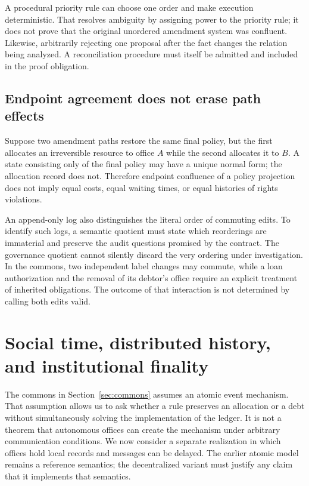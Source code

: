 \documentclass[11pt,letterpaper]{article}
\theoremstyle{plain}
\theoremstyle{definition}
\theoremstyle{remark}
\begin{document}
A procedural priority rule can choose one order and make execution deterministic. That resolves ambiguity by assigning power to the priority rule; it does not prove that the original unordered amendment system was confluent. Likewise, arbitrarily rejecting one proposal after the fact changes the relation being analyzed. A reconciliation procedure must itself be admitted and included in the proof obligation.

\subsection{Endpoint agreement does not erase path effects}
Suppose two amendment paths restore the same final policy, but the first allocates an irreversible resource to office $A$ while the second allocates it to $B$. A state consisting only of the final policy may have a unique normal form; the allocation record does not. Therefore endpoint confluence of a policy projection does not imply equal costs, equal waiting times, or equal histories of rights violations.

An append-only log also distinguishes the literal order of commuting edits. To identify such logs, a semantic quotient must state which reorderings are immaterial and preserve the audit questions promised by the contract. The governance quotient cannot silently discard the very ordering under investigation. In the commons, two independent label changes may commute, while a loan authorization and the removal of its debtor's office require an explicit treatment of inherited obligations. The outcome of that interaction is not determined by calling both edits valid.

\section{Social time, distributed history, and institutional finality}\label{sec:social-time}

The commons in Section~\ref{sec:commons} assumes an atomic event mechanism. That assumption allows us to ask whether a rule preserves an allocation or a debt without simultaneously solving the implementation of the ledger. It is not a theorem that autonomous offices can create the mechanism under arbitrary communication conditions. We now consider a separate realization in which offices hold local records and messages can be delayed. The earlier atomic model remains a reference semantics; the decentralized variant must justify any claim that it implements that semantics.
\end{document}
